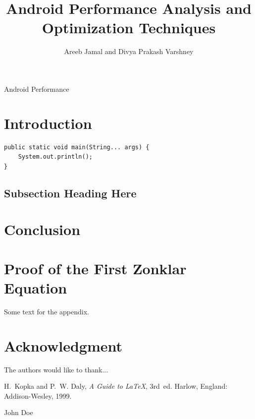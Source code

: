 \documentclass[journal]{IEEEtran}
\begin{document}
\title{Android Performance Analysis and \\ Optimization Techniques}

\author{Areeb Jamal and Divya Prakash Varshney \\
	 }

%
{Android Performance}


\maketitle


\begin{abstract}
\blindtext[1]
\end{abstract}


\section{Introduction}
\blindtext

\begin{verbatim}
public static void main(String... args) {
	System.out.println();
}
\end{verbatim}

\subsection{Subsection Heading Here}
\blindtext

\section{Conclusion}
\blindtext


\appendices
\section{Proof of the First Zonklar Equation}
Some text for the appendix.

\section*{Acknowledgment}

The authors would like to thank...

\begin{thebibliography}{1}

\bibitem{}
H.~Kopka and P.~W. Daly, \emph{A Guide to \LaTeX}, 3rd~ed. Harlow, England: Addison-Wesley, 1999.

\end{thebibliography}

\begin{IEEEbiography}{John Doe}
\blindtext
\end{IEEEbiography}
\end{document}
